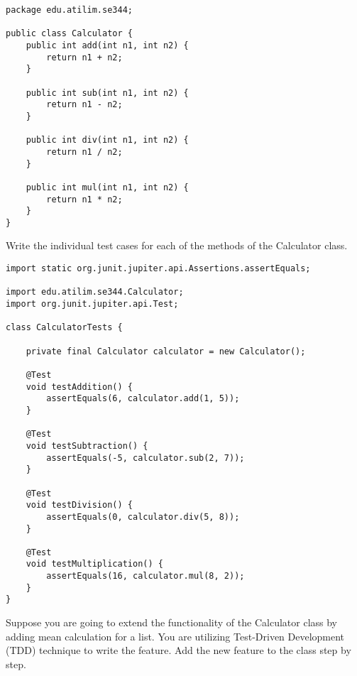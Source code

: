 \begin{lstlisting}[caption={A Calculator class implementation in Java.},label=lst:java-calc]
package edu.atilim.se344;

public class Calculator {
    public int add(int n1, int n2) {
        return n1 + n2;
    }
    
    public int sub(int n1, int n2) {
        return n1 - n2;
    }
    
    public int div(int n1, int n2) {
        return n1 / n2;
    }
    
    public int mul(int n1, int n2) {
        return n1 * n2;
    }
}
\end{lstlisting}

\begin{exercise}
    Write the individual test cases for each of the methods of the Calculator class.
\end{exercise}

\begin{solution}
    \begin{lstlisting}
import static org.junit.jupiter.api.Assertions.assertEquals;

import edu.atilim.se344.Calculator;
import org.junit.jupiter.api.Test;

class CalculatorTests {

    private final Calculator calculator = new Calculator();

    @Test
    void testAddition() {
        assertEquals(6, calculator.add(1, 5));
    }
    
    @Test
    void testSubtraction() {
        assertEquals(-5, calculator.sub(2, 7));
    }
    
    @Test
    void testDivision() {
        assertEquals(0, calculator.div(5, 8));
    }
    
    @Test
    void testMultiplication() {
        assertEquals(16, calculator.mul(8, 2));
    }
}
    \end{lstlisting}
\end{solution}

\begin{exercise}
    Suppose you are going to extend the functionality of the Calculator class by adding mean calculation for a list. You are utilizing Test-Driven Development (TDD) technique to write the feature. Add the new feature to the class step by step.
\end{exercise}

